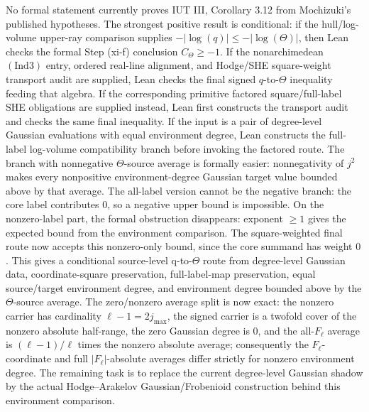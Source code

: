 \documentclass[11pt]{article}
\begin{document}
No formal statement currently proves IUT III, Corollary 3.12 from Mochizuki's
published hypotheses.  The strongest positive result is conditional: if the
hull/log-volume upper-ray comparison supplies
\(-|\log(q)|\le-|\log(\Theta)|\), then Lean checks the formal Step (xi-f)
conclusion \(C_\Theta\ge-1\).  If the nonarchimedean \((\mathrm{Ind3})\) entry,
ordered real-line alignment, and Hodge/SHE square-weight transport audit are
supplied, Lean checks the final signed \(q\)-to-\(\Theta\) inequality feeding
that algebra.  If the corresponding primitive factored square/full-label SHE
obligations are supplied instead, Lean first constructs the transport audit and
checks the same final inequality.  If the input is a pair of degree-level
Gaussian evaluations with equal environment degree, Lean constructs the
full-label log-volume compatibility branch before invoking the factored route.
The branch with nonnegative \(\Theta\)-source average is formally easier:
nonnegativity of \(j^2\) makes every nonpositive environment-degree Gaussian
target value bounded above by that average.  The all-label version cannot be
the negative branch: the core label contributes \(0\), so a negative upper bound
is impossible.  On the nonzero-label part, the formal obstruction disappears:
exponent \(\ge1\) gives the expected bound from the environment comparison.  The
square-weighted final route now accepts this nonzero-only bound, since the core
summand has weight \(0\).  This gives a conditional source-level q-to-\(\Theta\)
route from degree-level Gaussian data, coordinate-square preservation,
full-label-map preservation, equal source/target environment degree, and
environment degree bounded above by the \(\Theta\)-source average.  The
zero/nonzero average split is now exact: the nonzero carrier has cardinality
\(\ell-1=2j_{\max}\), the signed carrier is a twofold cover of the nonzero
absolute half-range, the zero Gaussian degree is \(0\), and the all-\(F_\ell\)
average is \((\ell-1)/\ell\) times the nonzero absolute average; consequently
the \(F_\ell\)-coordinate and full \(|F_\ell|\)-absolute averages differ
strictly for nonzero environment degree.  The remaining task is to replace
the current degree-level Gaussian shadow by the actual Hodge--Arakelov
Gaussian/Frobenioid construction behind this environment comparison.
\end{document}
